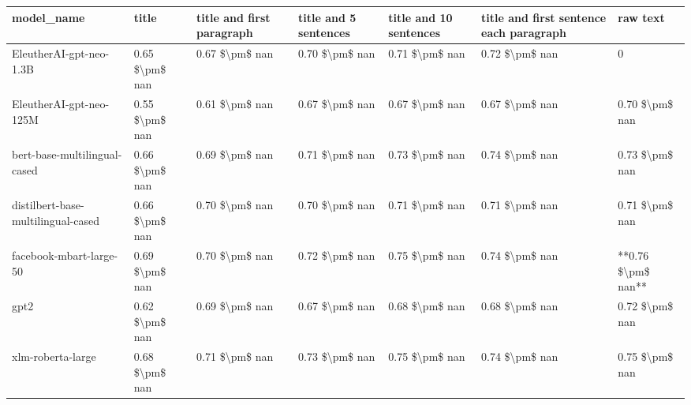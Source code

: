 \begin{tabular}{lllllll}
\toprule
                        model\_name &          title & title and first paragraph & title and 5 sentences & title and 10 sentences & title and first sentence each paragraph &           raw text \\
\midrule
           EleutherAI-gpt-neo-1.3B & 0.65 \$\textbackslash pm\$ nan &            0.67 \$\textbackslash pm\$ nan &        0.70 \$\textbackslash pm\$ nan &         0.71 \$\textbackslash pm\$ nan &                          0.72 \$\textbackslash pm\$ nan &                  0 \\
           EleutherAI-gpt-neo-125M & 0.55 \$\textbackslash pm\$ nan &            0.61 \$\textbackslash pm\$ nan &        0.67 \$\textbackslash pm\$ nan &         0.67 \$\textbackslash pm\$ nan &                          0.67 \$\textbackslash pm\$ nan &     0.70 \$\textbackslash pm\$ nan \\
      bert-base-multilingual-cased & 0.66 \$\textbackslash pm\$ nan &            0.69 \$\textbackslash pm\$ nan &        0.71 \$\textbackslash pm\$ nan &         0.73 \$\textbackslash pm\$ nan &                          0.74 \$\textbackslash pm\$ nan &     0.73 \$\textbackslash pm\$ nan \\
distilbert-base-multilingual-cased & 0.66 \$\textbackslash pm\$ nan &            0.70 \$\textbackslash pm\$ nan &        0.70 \$\textbackslash pm\$ nan &         0.71 \$\textbackslash pm\$ nan &                          0.71 \$\textbackslash pm\$ nan &     0.71 \$\textbackslash pm\$ nan \\
           facebook-mbart-large-50 & 0.69 \$\textbackslash pm\$ nan &            0.70 \$\textbackslash pm\$ nan &        0.72 \$\textbackslash pm\$ nan &         0.75 \$\textbackslash pm\$ nan &                          0.74 \$\textbackslash pm\$ nan & **0.76 \$\textbackslash pm\$ nan** \\
                              gpt2 & 0.62 \$\textbackslash pm\$ nan &            0.69 \$\textbackslash pm\$ nan &        0.67 \$\textbackslash pm\$ nan &         0.68 \$\textbackslash pm\$ nan &                          0.68 \$\textbackslash pm\$ nan &     0.72 \$\textbackslash pm\$ nan \\
                 xlm-roberta-large & 0.68 \$\textbackslash pm\$ nan &            0.71 \$\textbackslash pm\$ nan &        0.73 \$\textbackslash pm\$ nan &         0.75 \$\textbackslash pm\$ nan &                          0.74 \$\textbackslash pm\$ nan &     0.75 \$\textbackslash pm\$ nan \\
\bottomrule
\end{tabular}
